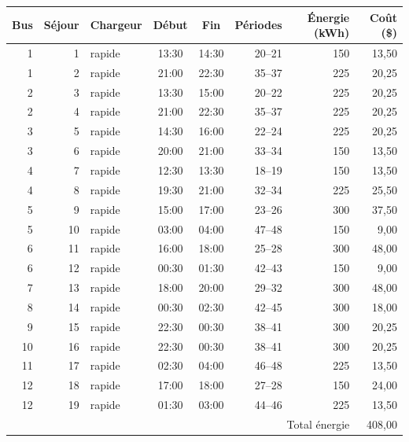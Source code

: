 \documentclass{article}
\begin{document}
\begin{center}
\begin{tabular}{rrlccrrr}
\hline
Bus & Séjour & Chargeur & Début & Fin & Périodes & Énergie (kWh) & Coût (\$) \\
\hline
1 & 1 & rapide & 13:30 & 14:30 & 20--21 & 150 & 13,50 \\
1 & 2 & rapide & 21:00 & 22:30 & 35--37 & 225 & 20,25 \\
2 & 3 & rapide & 13:30 & 15:00 & 20--22 & 225 & 20,25 \\
2 & 4 & rapide & 21:00 & 22:30 & 35--37 & 225 & 20,25 \\
3 & 5 & rapide & 14:30 & 16:00 & 22--24 & 225 & 20,25 \\
3 & 6 & rapide & 20:00 & 21:00 & 33--34 & 150 & 13,50 \\
4 & 7 & rapide & 12:30 & 13:30 & 18--19 & 150 & 13,50 \\
4 & 8 & rapide & 19:30 & 21:00 & 32--34 & 225 & 25,50 \\
5 & 9 & rapide & 15:00 & 17:00 & 23--26 & 300 & 37,50 \\
5 & 10 & rapide & 03:00 & 04:00 & 47--48 & 150 & 9,00 \\
6 & 11 & rapide & 16:00 & 18:00 & 25--28 & 300 & 48,00 \\
6 & 12 & rapide & 00:30 & 01:30 & 42--43 & 150 & 9,00 \\
7 & 13 & rapide & 18:00 & 20:00 & 29--32 & 300 & 48,00 \\
8 & 14 & rapide & 00:30 & 02:30 & 42--45 & 300 & 18,00 \\
9 & 15 & rapide & 22:30 & 00:30 & 38--41 & 300 & 20,25 \\
10 & 16 & rapide & 22:30 & 00:30 & 38--41 & 300 & 20,25 \\
11 & 17 & rapide & 02:30 & 04:00 & 46--48 & 225 & 13,50 \\
12 & 18 & rapide & 17:00 & 18:00 & 27--28 & 150 & 24,00 \\
12 & 19 & rapide & 01:30 & 03:00 & 44--46 & 225 & 13,50 \\
\hline
\multicolumn{7}{r}{Total énergie} & 408,00 \\
\hline
\end{tabular}
\end{center}
\end{document}
